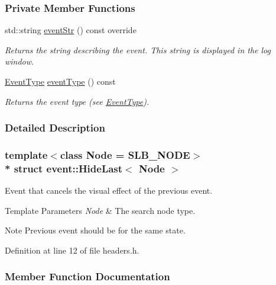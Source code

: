 \subsubsection*{Private Member Functions}
\begin{DoxyCompactItemize}
\item 
std\+::string \hyperlink{structevent_1_1HideLast_aeca91204534e7599b57784c84310eb84}{event\+Str} () const override
\begin{DoxyCompactList}\small\item\em Returns the string describing the event. This string is displayed in the log window. \end{DoxyCompactList}\item 
\hyperlink{event__base_8h_a2628ea8d12e8b2563c32f05dc7fff6fa}{Event\+Type} \hyperlink{structevent_1_1HideLast_ad42dfc561d190d669c0acc8123362390}{event\+Type} () const 
\begin{DoxyCompactList}\small\item\em Returns the event type (see \hyperlink{event__base_8h_a2628ea8d12e8b2563c32f05dc7fff6fa}{Event\+Type}). \end{DoxyCompactList}\end{DoxyCompactItemize}


\subsubsection{Detailed Description}
\subsubsection*{template$<$class Node = S\+L\+B\+\_\+\+N\+O\+DE$>$\\*
struct event\+::\+Hide\+Last$<$ Node $>$}

Event that cancels the visual effect of the previous event. 


\begin{DoxyTemplParams}{Template Parameters}
{\em Node} & The search node type. \\
\hline
\end{DoxyTemplParams}
\begin{DoxyNote}{Note}
Previous event should be for the same state. 
\end{DoxyNote}


Definition at line 12 of file headers.\+h.



\subsubsection{Member Function Documentation}
